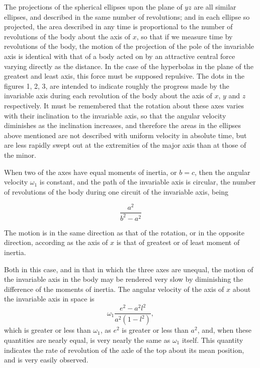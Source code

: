 \documentclass[12pt]{article}
\begin{document}
The projections of the spherical ellipses upon the plane of $yz$ are
all similar ellipses, and described in the same number of revolutions;
and in each ellipse so projected, the area described in any time is
proportional to the number of revolutions of the body about the axis
of $x$, so that if we measure time by revolutions of the body, the
motion of the projection of the pole of the invariable axis is
identical with that of a body acted on by an attractive central force
varying directly as the distance.  In the case of the hyperbolas in
the plane of the greatest and least axis, this force must be supposed
repulsive.  The dots in the figures 1, 2, 3, are intended to indicate
roughly the progress made by the invariable axis during each
revolution of the body about the axis of $x$, $y$ and $z$
respectively.  It must be remembered that the rotation about these
axes varies with their inclination to the invariable axis, so that the
angular velocity diminishes as the inclination increases, and
therefore the areas in the ellipses above mentioned are not described
with uniform velocity in absolute time, but are less rapidly swept out
at the extremities of the major axis than at those of the minor.

\footnotemark[1]When two of the axes have equal moments of inertia, or
$b = c$, then the angular velocity $\omega_1$ is constant, and the
path of the invariable axis is circular, the number of revolutions of
the body during one circuit of the invariable axis, being

\begin{displaymath}
\frac{a^2}{b^2 - a^2}
\end{displaymath}

The motion is in the same direction as that of the rotation, or in the
opposite direction, according as the axis of $x$ is that of greatest
or of least moment of inertia.

\footnotemark[1]Both in this case, and in that in which the three axes
are unequal, the motion of the invariable axis in the body may be
rendered very slow by diminishing the difference of the moments of
inertia.  The angular velocity of the axis of $x$ about the invariable
axis in space is
%
\begin{displaymath}
\omega_1\frac{e^2 - a^2l^2}{a^2(1 - l^2)},
\end{displaymath}
%
which is greater or less than $\omega_1$, as $e^2$ is greater or less
than $a^2$, and, when these quantities are nearly equal, is very
nearly the same as $\omega_1$ itself.  This quantity indicates the
rate of revolution of the axle of the top about its mean position, and
is very easily observed.
\end{document}
